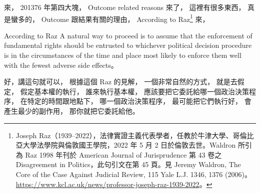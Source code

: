 \hypertarget{w06:cue:2135}{}來，
\hypertarget{w06:cue:2136}{}201376 年第四大塊，
\hypertarget{w06:cue:2137}{}Outcome related reasons
\hypertarget{w06:cue:2138}{}來了，
\hypertarget{w06:cue:2139}{}這裡有很多東西，
\hypertarget{w06:cue:2140}{}真是蠻多的，
\hypertarget{w06:cue:2141}{}Outcome
\hypertarget{w06:cue:2142}{}跟結果有關的理由，
\hypertarget{w06:cue:2143}{}According to Raz\footnote{Joseph Raz（1939–2022），法律實證主義代表學者，任教於牛津大學、哥倫比亞大學法學院與倫敦國王學院，2022 年 5 月 2 日於倫敦去世。Waldron 所引為 Raz 1998 年刊於 American Journal of Jurisprudence 第 43 卷之 Disagreement in Politics，此句引文在第 45 頁。見 Jeremy Waldron, The Core of the Case Against Judicial Review, 115 Yale L.J. 1346, 1376 (2006)。\url{https://www.kcl.ac.uk/news/professor-joseph-raz-1939-2022}。}
\hypertarget{w06:cue:2144}{}來，

\hypertarget{w06:cue:2145}{}According to Raz
\hypertarget{w06:cue:2146}{}A natural way to proceed
\hypertarget{w06:cue:2147}{}is to assume that
\hypertarget{w06:cue:2148}{}the enforcement of fundamental rights
\hypertarget{w06:cue:2149}{}should be entrusted
\hypertarget{w06:cue:2150}{}to whichever political decision procedure is
\hypertarget{w06:cue:2151}{}in the circumstances of the time and place
\hypertarget{w06:cue:2152}{}most likely to enforce them well
\hypertarget{w06:cue:2153}{}with the fewest adverse side effects。

\hypertarget{w06:cue:2154}{}好，講這句就可以，
\hypertarget{w06:cue:2155}{}根據這個 Raz 的見解，
\hypertarget{w06:cue:2156}{}一個非常自然的方式，
\hypertarget{w06:cue:2157}{}就是去假定，
\hypertarget{w06:cue:2158}{}假定基本權的執行，
\hypertarget{w06:cue:2159}{}誰來執行基本權，
\hypertarget{w06:cue:2160}{}應該要把它委託給哪一個政治決策程序，
\hypertarget{w06:cue:2161}{}在特定的時間跟地點下，
\hypertarget{w06:cue:2162}{}哪一個政治決策程序，
\hypertarget{w06:cue:2163}{}最可能把它們執行好，
\hypertarget{w06:cue:2164}{}會產生最少的副作用，
\hypertarget{w06:cue:2165}{}那你就把它委託給他。

